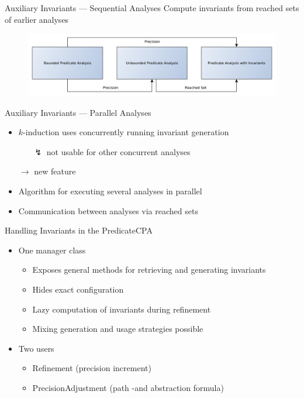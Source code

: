 \documentclass{beamer}
\begin{document}
\begin{frame}{Auxiliary Invariants --- Sequential Analyses}
 Compute invariants from reached sets of earlier analyses\\[2ex]

\begin{adjustwidth}{-3.5em}{-3.5em}
\begin{figure}
 \centering
  \includegraphics[width=1.20\textwidth]{../../graphics/sequential_invgen}
\end{figure}

\end{adjustwidth}
\end{frame}

\begin{frame}{Auxiliary Invariants --- Parallel Analyses}
 \begin{itemize}
  \item $k$-induction uses concurrently running invariant generation
  \begin{itemize}
  \item[$\lightning$] not usable for other concurrent analyses
  \end{itemize}
  \item[$\rightarrow$] new {} feature
  \item[]
  \item Algorithm for executing several analyses in parallel
  \item Communication between analyses via reached sets
 \end{itemize}
\end{frame}

\begin{frame}{Handling Invariants in the PredicateCPA}
 \begin{itemize}
  \item One manager class
  \begin{itemize}
  \item Exposes general methods for retrieving and generating invariants
  \item Hides exact configuration
  \item Lazy computation of invariants during refinement
  \item Mixing generation and usage strategies possible
  \end{itemize}
  \pause
  \item Two users
  \begin{itemize}
   \item Refinement (precision increment)
   \item PrecisionAdjustment (path -and abstraction formula)
  \end{itemize}
 \end{itemize}
\end{frame}
\end{document}

